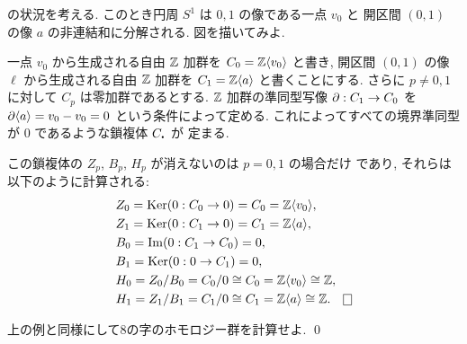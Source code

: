 \documentclass[12pt,twoside]{jarticle}
\begin{document}
\begin{example}
\label{example:S^1-trivial}
  の状況を考える.
  このとき円周 $S^1$ は $0,1$ の像である一点 $v_0$ と
  開区間 $(0,1)$ の像 $a$ の非連結和に分解される. 
  図を描いてみよ.

  一点 $v_0$ から生成される自由 ${\mathbb Z}$ 加群を $C_0={\mathbb Z}\langle v_0\rangle$ と書き,
  開区間 $(0,1)$ の像 $\ell$ から生成される自由 ${\mathbb Z}$ 加群を $C_1={\mathbb Z}\langle a\rangle$ 
  と書くことにする. さらに $p\ne 0,1$ に対して $C_p$ は零加群であるとする.
  ${\mathbb Z}$ 加群の準同型写像 $\partial: C_1 \to C_0$ を $\partial\langle a\rangle=v_0-v_0=0$ 
  という条件によって定める.
  これによってすべての境界準同型が $0$ であるような鎖複体 $C_\bcdot$ が
  定まる.

  この鎖複体の $Z_p$, $B_p$, $H_p$ が消えないのは $p=0,1$ の場合だけ
  であり, それらは以下のように計算される:
  \begin{align*}
    &
    Z_0 = \Ker(0:C_0\to 0) = C_0 = \Z\bra v_0\ket,
    \\ &
    Z_1 = \Ker(0:C_1\to 0) = C_1 = \Z\bra a\ket,
    \\ &
    B_0 = \Image(0:C_1\to C_0) = 0,
    \\ &
    B_1 = \Ker(0:0\to C_1) = 0,
    \\ &
    H_0 = Z_0/B_0 = C_0/0 \isom C_0 = \Z\bra v_0\ket \isom \Z,
    \\ &
    H_1 = Z_1/B_1 = C_1/0 \isom C_1 = \Z\bra a\ket \isom \Z.
    \qed
  \end{align*}
\end{example}

\begin{question}[8の字のホモロジー群]
\label{q:8-trivial}
  上の例と同様にして8の字のホモロジー群を計算せよ.
  \qed
\end{question}
\end{document}
